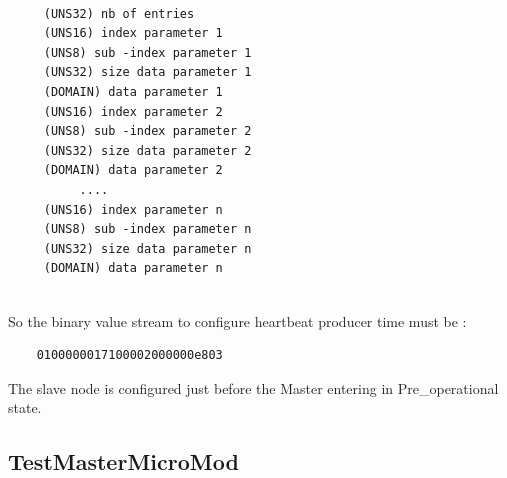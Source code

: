 \documentclass[12pt,english,a4paper]{book}
\begin{document}
\begin{verbatim}

	 (UNS32) nb of entries
	 (UNS16) index parameter 1
	 (UNS8) sub -index parameter 1
	 (UNS32) size data parameter 1
	 (DOMAIN) data parameter 1
	 (UNS16) index parameter 2
	 (UNS8) sub -index parameter 2
	 (UNS32) size data parameter 2
	 (DOMAIN) data parameter 2
	      ....
	 (UNS16) index parameter n
	 (UNS8) sub -index parameter n
	 (UNS32) size data parameter n
	 (DOMAIN) data parameter n
	 
\end{verbatim}


So the binary value stream to configure heartbeat producer
time must be :


\begin{verbatim}
	0100000017100002000000e803
\end{verbatim}


The slave node is configured just before the Master entering
in Pre\_operational state.


\bigskip{}


\subsection{TestMasterMicroMod }
\end{document}
